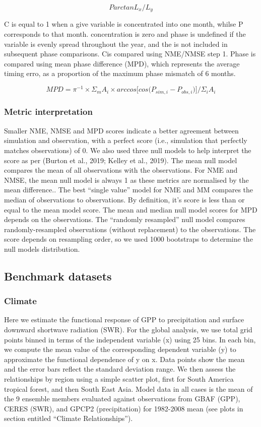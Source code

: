 \documentclass[bg, manuscript]{copernicus}
\begin{document}
\begin{equation}
    P arctan{L_x/L_y}
\end{equation}

C is equal to 1 when a give variable is concentrated into one month, whilse P corresponds to that month. concentration is zero and phase is undefined if the variable  is evenly spread throughout the year, and the is not included in subsequent phase comparisons. Cis compared using NME/NMSE step 1. Phase is compared using mean phase difference (MPD), which represents the average timing erro, as a proportion of the maximum phase mismatch of 6 months.

\begin{equation}
    MPD = \pi^{-1} \times \Sigma_m A_i \times arccos \big[ cos \big(P_{sim, i} - P_{obs, i} \big) \big] / \Sigma_i A_i 
\end{equation}

\subsubsection{Metric interpretation}
Smaller NME, NMSE and MPD scores indicate a better agreement between simulation and observation, with a perfect score (i.e., simulation that perfectly matches observations) of 0. We also used three null models to help interpret the score as per (Burton et al., 2019; Kelley et al., 2019). The mean null model compares the mean of all observations with the observations. For NME and NMSE, the mean null model is always 1 as these metrics are normalised by the mean difference.. The best “single value” model for NME and MM compares the median of observations to observations. By definition, it’s score is less than or equal to the mean model score. The mean and median null model scores for MPD depends on the observations. The “randomly resampled” null model compares randomly-resampled observations (without replacement) to the observations. The score depends on resampling order, so we used 1000 bootstraps to determine the null models distribution. 

\subsection{Benchmark datasets}

\subsubsection{Climate}
Here we estimate the functional response of GPP to precipitation and surface downward shortwave radiation (SWR). For the global analysis, we use total grid points binned in terms of the independent variable (x) using 25 bins. In each bin, we compute the mean value of the corresponding dependent variable (y) to approximate the functional dependence of y on x. Data points show the mean and the error bars reﬂect the standard deviation range. We then assess the relationships by region using a simple scatter plot, first for South America tropical forest, and then South East Asia. Model data in all cases is the mean of the 9 ensemble members evaluated against observations from GBAF (GPP), CERES (SWR), and GPCP2 (precipitation) for 1982-2008 mean (see plots in section entitled “Climate Relationships”).
\end{document}
